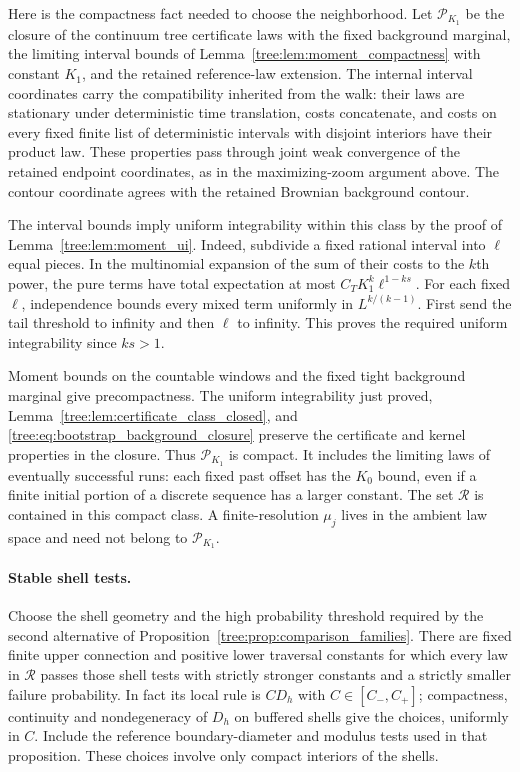 Here is the compactness fact needed to choose the neighborhood.
Let $\mathcal P_{K_1}$ be the closure of the continuum tree
certificate laws with the fixed background marginal, the limiting
interval bounds of Lemma~\ref{tree:lem:moment_compactness} with
constant $K_1$, and the retained reference-law extension. The
internal interval coordinates carry the compatibility inherited
from the walk: their laws are stationary under deterministic time
translation, costs concatenate, and costs on every fixed finite
list of deterministic intervals with disjoint interiors have
their product law. These
properties pass through joint weak convergence of the retained
endpoint coordinates, as in the maximizing-zoom argument above.
The contour coordinate agrees with the retained Brownian
background contour.

The interval bounds imply uniform integrability within this class
by the proof of Lemma~\ref{tree:lem:moment_ui}. Indeed, subdivide a
fixed rational interval into $\ell$ equal pieces. In the multinomial
expansion of the sum of their costs to the $k$th power, the pure
terms have total expectation at most
$C_TK_1^k \ell^{1-ks}$. For each fixed $\ell$, independence bounds every
mixed term uniformly in $L^{k/(k-1)}$. First send the tail threshold
to infinity and then $\ell$ to infinity. This proves the required
uniform integrability since $ks>1$.

Moment bounds on the countable windows and the fixed tight
background marginal give precompactness. The uniform
integrability just proved, Lemma~\ref{tree:lem:certificate_class_closed},
and \eqref{tree:eq:bootstrap_background_closure} preserve the
certificate and kernel properties in the closure. Thus
$\mathcal P_{K_1}$ is compact. It includes the limiting laws of
eventually successful runs: each fixed past offset has the
$K_0$ bound, even if a finite initial portion of a discrete
sequence has a larger constant. The set $\mathcal R$ is contained
in this compact class. A finite-resolution $\mu_j$ lives in the
ambient law space and need not belong to $\mathcal P_{K_1}$.

\paragraph{Stable shell tests.}
Choose the shell geometry and the high probability threshold
required by the second alternative of
Proposition~\ref{tree:prop:comparison_families}.  There are fixed
finite upper connection and positive lower traversal constants
for which every law in $\mathcal R$ passes those shell tests
with strictly stronger constants and a strictly smaller failure
probability.  In fact its local rule is $C D_h$ with
$C\in[C_-,C_+]$; compactness, continuity and nondegeneracy of
$D_h$ on buffered shells give the choices, uniformly in $C$.
Include the reference boundary-diameter and modulus tests used
in that proposition.  These choices involve only compact
interiors of the shells.

